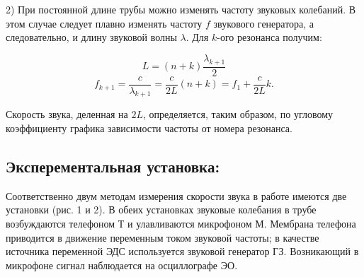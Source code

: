 \documentclass[11pt,a4paper,oneside]{article}
\begin{document}
		2) При постоянной длине трубы можно изменять частоту звуковых
		колебаний. В этом случае следует плавно изменять частоту $f$ звукового генератора, а следовательно, и длину звуковой волны $\lambda$.
		Для $k$-ого резонанса получим:

		$$L = (n+k)\frac{\lambda_{k+1}}{2}$$
		$$f_{k+1} = \frac{c}{\lambda_{k+1}}=\frac{c}{2L}(n+k)=f_1 + \frac{c}{2L}k.$$
		
		Скорость звука, деленная на $2L$, определяется, таким образом,
		по угловому коэффициенту графика зависимости частоты от номера
		резонанса.
	\subsection{Эксперементальная установка:}
	\begin{figure}[h]
	\end{figure}
	Соответственно двум методам измерения скорости звука в работе имеются две установки (рис. 1 и 2). В обеих установках звуковые колебания в трубе возбуждаются телефоном Т и улавливаются микрофоном М. Мембрана телефона приводится в движение переменным током звуковой частоты; в качестве источника переменной ЭДС используется звуковой генератор ГЗ. Возникающий в микрофоне сигнал наблюдается на осциллографе ЭО.
\end{document}
